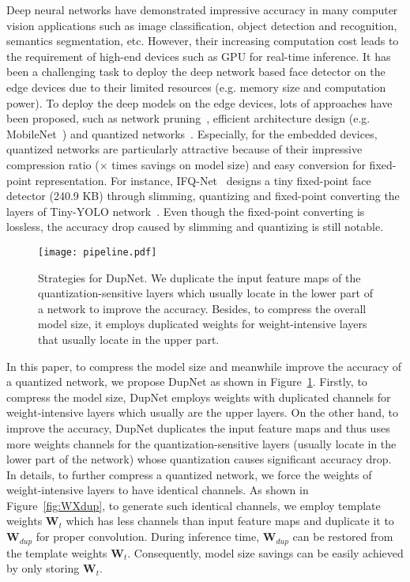 \documentclass[10pt,twocolumn,letterpaper]{article}
\begin{document}
Deep neural networks have demonstrated impressive accuracy in many computer vision applications such as image classification, object detection and recognition, semantics segmentation, etc. However, their increasing computation cost leads to the requirement of high-end devices such as GPU for real-time inference. It has been a challenging task to deploy the deep network based face detector on the edge devices due to their limited resources (e.g. memory size and computation power). To deploy the deep models on the edge devices, lots of approaches have been proposed, such as network pruning~\cite{Prun1,Prun2}, efficient architecture design (e.g. MobileNet~\cite{MobileNetv1,MobileNetv2}) and quantized networks~\cite{XNOR,HWGQ}. Especially, for the embedded devices, quantized networks are particularly attractive because of their impressive compression ratio ($\times$ times savings on model size) and easy conversion for fixed-point representation. For instance, IFQ-Net~\cite{IFQNet} designs a tiny fixed-point face detector (240.9 KB) through slimming, quantizing and fixed-point converting the layers of Tiny-YOLO network~\cite{TinyYOLO}. Even though the fixed-point converting is lossless,  the accuracy drop caused by slimming and quantizing is still notable.

\begin{figure}[t]
	\begin{center}
		\texttt{[image: pipeline.pdf]}
	\end{center}
	\caption{Strategies for DupNet. We duplicate the input feature maps of the  quantization-sensitive layers which usually locate in the lower part of a network to improve the accuracy. Besides, to compress the overall model size, it employs duplicated weights for weight-intensive layers that usually locate in the upper part.}
	\label{fig:pipeline}
\end{figure}



In this paper, to compress the model size and meanwhile improve the accuracy of a quantized network, we propose DupNet as shown in Figure~\ref{fig:pipeline}. Firstly, to compress the model size, DupNet employs weights with duplicated channels for weight-intensive layers which usually are the upper layers. On the other hand, to improve the accuracy, DupNet duplicates the input feature maps and thus uses more weights channels for the quantization-sensitive layers (usually locate in the lower part of the network) whose quantization causes significant accuracy drop. In details, to further compress a quantized network, we force the weights of weight-intensive layers to have identical channels. As shown in Figure~\ref{fig:WXdup}, to generate such identical channels,  we employ template weights $\textbf{W}_t$  which has less channels than input feature maps and duplicate it to $\textbf{W}_{dup}$ for proper convolution. During inference time,  $\textbf{W}_{dup}$ can be restored from the template weights $\textbf{W}_{t}$. Consequently, model size savings can be easily achieved by only storing $\textbf{W}_{t}$.
\end{document}
